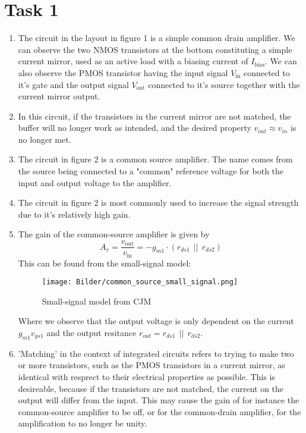 \documentclass[a4paper,11pt,norsk]{article}
\begin{document}


\section*{Task 1}
\begin{enumerate}
    \item The circuit in the layout in figure 1 is a simple common drain amplifier. 
        We can observe the two NMOS transistors at the bottom constituting a simple current mirror, used as an active load with a biasing current of $I_{\text{bias}}$.
        We can also observe the PMOS transistor having the input signal $V_{\text{in}}$ connected to it's gate and the output signal $V_{\text{out}}$ connected to it's 
        source together with the current mirror output.
    \item In this circuit, if the transistors in the current mirror are not matched, the buffer will no longer work as intended, 
        and the desired property $v_{out} \approx v_{in}$ is no longer met.
    \item The circuit in figure 2 is a common source amplifier. The name comes from the source being connected to a "common" reference voltage for both the input and output voltage to the amplifier.
    \item The circuit in figure 2 is most commonly used to increase the signal strength due to it's relatively high gain.
    \item The gain of the common-source amplifier is given by
        \[
            A_v = \frac{v_{\text{out}}}{v_{\text{in}}} = -g_{m1} \cdot (r_{ds1} \:\:||\:\: r_{ds2})
        \]
        This can be found from the small-signal model:
        \begin{figure}[H]
            \centering
            \texttt{[image: Bilder/common\_source\_small\_signal.png]}
            \caption{Small-signal model from CJM}
        \end{figure}
        Where we observe that the output voltage is only dependent on the current $g_{m1}v_{gs1}$ and the 
        output resitance $r_{out} = r_{ds1} \:\:||\:\: r_{ds2}$.
    \item 'Matching' in the context of integrated circuits refers to trying to make two or more transistors,
        such as the PMOS transistors in a current mirror, as identical with resprect to their electrical properties as possible.
        This is desireable, because if the transistors are not matched, the current on the output will differ from the input. This may cause 
        the gain of for instance the common-source amplifier to be off, or for the common-drain amplifier, for the 
        amplification to no longer be unity.
\end{enumerate}
\end{document}
